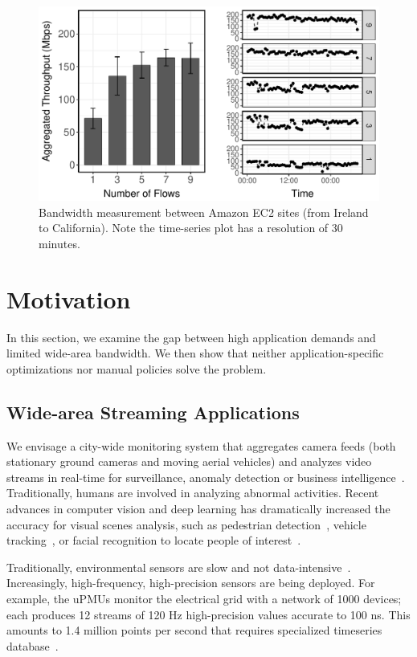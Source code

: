 \begin{figure}
  \centering
  \includegraphics[width=.9\linewidth]{figures/motiv-aws.pdf}
  \caption{Bandwidth measurement between Amazon EC2 sites (from Ireland to
    California). Note the time-series plot has a resolution of 30 minutes.}
  \label{fig:bw}
\end{figure}

\section{Motivation}
\label{sec:motivation}

In this section, we examine the gap between high application demands and limited
wide-area bandwidth. We then show that neither application-specific
optimizations nor manual policies solve the problem.

\subsection{Wide-area Streaming Applications}
\label{sec:wide-area-streaming}

 We envisage a city-wide monitoring system that
aggregates camera feeds (both stationary ground cameras and moving aerial
vehicles) and analyzes video streams in real-time for surveillance, anomaly
detection or business intelligence~\cite{oh2011large}. Traditionally, humans are
involved in analyzing abnormal activities. Recent advances in computer vision
and deep learning has dramatically increased the accuracy for visual scenes
analysis, such as pedestrian detection~\cite{dollar2012pedestrian}, vehicle
tracking~\cite{coifman1998real}, or facial recognition to locate people of
interest~\cite{parkhi2015deep, Lu:2015:SHF:2888116.2888245}.

 Traditionally, environmental sensors are slow
and not data-intensive~\cite{atzori2010internet}. Increasingly, high-frequency,
high-precision sensors are being deployed. For example, the uPMUs monitor the
electrical grid with a network of 1000 devices; each produces 12 streams of 120
Hz high-precision values accurate to 100 ns. This amounts to 1.4 million points
per second that requires specialized timeseries
database~\cite{andersen2016btrdb}.

